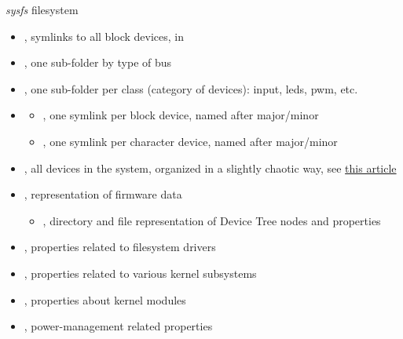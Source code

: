 \begin{frame}{{\em sysfs} filesystem}
  \begin{itemize}
  \item {}, symlinks to all block devices, in
  \item {}, one sub-folder by type of bus
  \item {}, one sub-folder per class (category of devices):
    input, leds, pwm, etc.
  \item {}
    \begin{itemize}
    \item {}, one symlink per block device, named after
      major/minor
    \item {}, one symlink per character device, named after
      major/minor
    \end{itemize}
  \item {}, all devices in the system, organized in a
    slightly chaotic way, see \href{https://lwn.net/Articles/646617/}{this article}
  \item {}, representation of firmware data
    \begin{itemize}
    \item {}, directory and file representation of
      Device Tree nodes and properties
    \end{itemize}
  \item {}, properties related to filesystem drivers
  \item {}, properties related to various kernel subsystems
  \item {}, properties about kernel modules
  \item {}, power-management related properties
  \end{itemize}
\end{frame}

